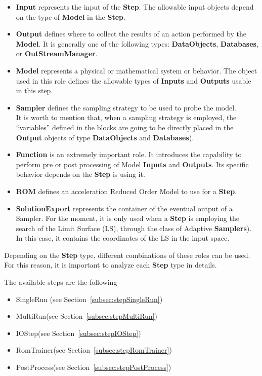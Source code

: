 \begin{itemize}
\item \textbf{Input} represents the input of the \textbf{Step}.
The allowable input objects depend on the type of \textbf{Model} in the
\textbf{Step}.
\item \textbf{Output} defines where to collect the results of an action
performed by the \textbf{Model}.
It is generally one of the following types: \textbf{DataObjects}, \textbf{Databases}, 
or \textbf{OutStreamManager}.
\item \textbf{Model} represents a physical or mathematical system or behavior.
The object used in this role defines the allowable types of
\textbf{Inputs} and \textbf{Outputs} usable in this step.
\item \textbf{Sampler} defines the sampling strategy to be used to probe the model.
\\ It is worth to mention that, when a sampling strategy is employed, the ``variables'' defined in the  blocks are going to be 
directly placed in the \textbf{Output} objects of type \textbf{DataObjects} and \textbf{Databases}).
\item \textbf{Function} is an extremely important role. It introduces the capability to
perform pre or post processing of Model \textbf{Inputs} and \textbf{Outputs}. Its specific
behavior depends on the \textbf{Step} is using it.
\item \textbf{ROM} defines an acceleration Reduced Order Model to use for a 
\textbf{Step}.
\item \textbf{SolutionExport} represents the container of the eventual output
of a Sampler. For the moment, it is only used  when a \textbf{Step} is employing the 
search of the Limit Surface (LS), through the class of Adaptive \textbf{Samplers}). In this case, it 
contains the coordinates of the LS in the input space. 
\end{itemize}
Depending on the \textbf{Step} type, different combinations of these roles can
be used.
For this reason, it is important to analyze each \textbf{Step} type in details.

The available steps are the following
\begin{itemize}
\item SingleRun (see Section~\ref{subsec:stepSingleRun})
\item MultiRun(see Section~\ref{subsec:stepMultiRun})
\item IOStep(see Section~\ref{subsec:stepIOStep})
\item RomTrainer(see Section~\ref{subsec:stepRomTrainer})
\item PostProcess(see Section~\ref{subsec:stepPostProcess})
\end{itemize}


